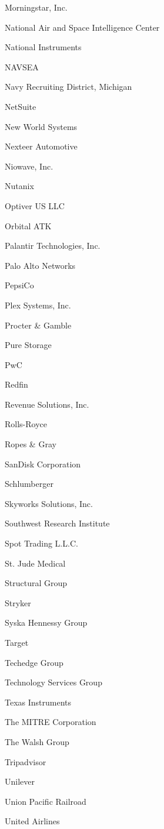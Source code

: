 \documentclass[twoside]{article}
\begin{document}
\begin{center}
\begin{multicols}{5}
\begin{FlushLeft}
\begin{compactitem}
\item Morningstar, Inc.
\item National Air and Space Intelligence Center
\item National Instruments
\item NAVSEA
\item Navy Recruiting District, Michigan
\item NetSuite
\item New World Systems
\item Nexteer Automotive
\item Niowave, Inc.
\item Nutanix
\item Optiver US LLC
\item Orbital ATK
\item Palantir Technologies, Inc.
\item Palo Alto Networks
\item PepsiCo
\item Plex Systems, Inc.
\item Procter \& Gamble
\item Pure Storage
\item PwC
\item Redfin
\item Revenue Solutions, Inc.
\item Rolls-Royce
\item Ropes \& Gray
\item SanDisk Corporation
\item Schlumberger
\item Skyworks Solutions, Inc.
\item Southwest Research Institute
\item Spot Trading L.L.C.
\item St. Jude Medical
\item Structural Group
\item Stryker
\item Syska Hennessy Group
\item Target
\item Techedge Group
\item Technology Services Group
\item Texas Instruments
\item The MITRE Corporation
\item The Walsh Group
\item Tripadvisor
\item Unilever
\item Union Pacific Railroad
\item United Airlines

\end{compactitem}
\end{FlushLeft}
\end{multicols}
\end{center}
\end{document}
